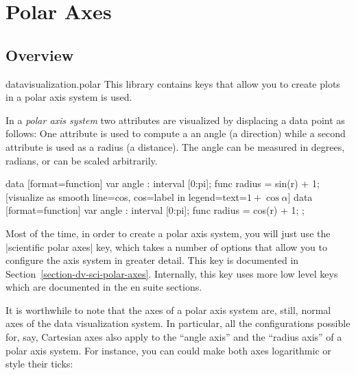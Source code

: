 %
%
%




\section{Polar Axes}

\label{section-dv-polar}


\subsection{Overview}

\begin{tikzlibrary}{datavisualization.polar}
  This library contains keys that allow you to create plots in a polar
  axis system is used. 
\end{tikzlibrary}

In a \emph{polar axis system} two attributes are visualized by
displacing a data point as follows: One attribute is used to compute a
an angle (a direction) while a second attribute is used as a radius (a
distance). The angle can be measured in degrees, radians, or can be
scaled arbitrarily.


\begin{codeexample}[width=8.5cm]
\tikz \datavisualization [
  scientific polar axes={0 to pi, clean},
  all axes=grid,
  style sheet=vary hue,
  legend=below
  ]
  [visualize as smooth line=sin,
   sin={label in legend={text=$1+\sin \alpha$}}]
  data [format=function] {
    var  angle : interval [0:pi];
    func radius = sin(\value{angle}r) + 1;
  }
  [visualize as smooth line=cos,
   cos={label in legend={text=$1+\cos\alpha$}}]
  data [format=function] {
    var  angle : interval [0:pi];
    func radius = cos(\value{angle}r) + 1;
  };
\end{codeexample}

Most of the time, in order to create a polar axis system, you will
just use the |scientific polar axes| key, which takes a number of
options that allow you to configure the axis system in greater
detail. This key is documented in
Section~\ref{section-dv-sci-polar-axes}. Internally, this key uses
more low level keys which are documented in the en suite sections.

It is worthwhile to note that the axes of a polar axis system are,
still, normal axes of the data visualization system. In particular,
all the configurations possible for, say, Cartesian axes also apply to
the ``angle axis'' and the ``radius axis'' of a polar axis system. For
instance, you can could make both axes logarithmic or style their
ticks:

